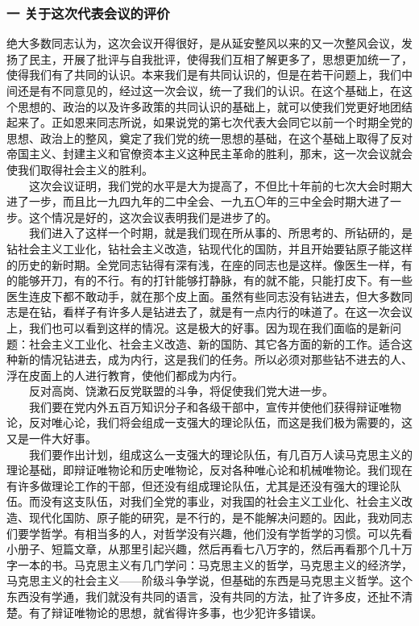 \documentclass[cn,11pt,chinese]{elegantbook}
\def\myformat#1{\hfil\hfil #1}
\begin{document}
\subsubsection*{\myformat{一 关于这次代表会议的评价}}
绝大多数同志认为，这次会议开得很好，是从延安整风以来的又一次整风会议，发扬了民主，开展了批评与自我批评，使得我们互相了解更多了，思想更加统一了，使得我们有了共同的认识。本来我们是有共同认识的，但是在若干问题上，我们中间还是有不同意见的，经过这一次会议，统一了我们的认识。在这个基础上，在这个思想的、政治的以及许多政策的共同认识的基础上，就可以使我们党更好地团结起来了。正如恩来同志所说，如果说党的第七次代表大会同它以前一个时期全党的思想、政治上的整风，奠定了我们党的统一思想的基础，在这个基础上取得了反对帝国主义、封建主义和官僚资本主义这种民主革命的胜利，那末，这一次会议就会使我们取得社会主义的胜利。\\
　　这次会议证明，我们党的水平是大为提高了，不但比十年前的七次大会时期大进了一步，而且比一九四九年的二中全会、一九五〇年的三中全会时期大进了一步。这个情况是好的，这次会议表明我们是进步了的。\\
　　我们进入了这样一个时期，就是我们现在所从事的、所思考的、所钻研的，是钻社会主义工业化，钻社会主义改造，钻现代化的国防，并且开始要钻原子能这样的历史的新时期。全党同志钻得有深有浅，在座的同志也是这样。像医生一样，有的能够开刀，有的不行。有的打针能够打静脉，有的就不能，只能打皮下。有一些医生连皮下都不敢动手，就在那个皮上面。虽然有些同志没有钻进去，但大多数同志是在钻，看样子有许多人是钻进去了，就是有一点内行的味道了。在这一次会议上，我们也可以看到这样的情况。这是极大的好事。因为现在我们面临的是新问题：社会主义工业化、社会主义改造、新的国防、其它各方面的新的工作。适合这种新的情况钻进去，成为内行，这是我们的任务。所以必须对那些钻不进去的人、浮在皮面上的人进行教育，使他们都成为内行。\\
　　反对高岗、饶漱石反党联盟的斗争，将促使我们党大进一步。\\
　　我们要在党内外五百万知识分子和各级干部中，宣传并使他们获得辩证唯物论，反对唯心论，我们将会组成一支强大的理论队伍，而这是我们极为需要的，这又是一件大好事。\\
　　我们要作出计划，组成这么一支强大的理论队伍，有几百万人读马克思主义的理论基础，即辩证唯物论和历史唯物论，反对各种唯心论和机械唯物论。我们现在有许多做理论工作的干部，但还没有组成理论队伍，尤其是还没有强大的理论队伍。而没有这支队伍，对我们全党的事业，对我国的社会主义工业化、社会主义改造、现代化国防、原子能的研究，是不行的，是不能解决问题的。因此，我劝同志们要学哲学。有相当多的人，对哲学没有兴趣，他们没有学哲学的习惯。可以先看小册子、短篇文章，从那里引起兴趣，然后再看七八万字的，然后再看那个几十万字一本的书。马克思主义有几门学问：马克思主义的哲学，马克思主义的经济学，马克思主义的社会主义——阶级斗争学说，但基础的东西是马克思主义哲学。这个东西没有学通，我们就没有共同的语言，没有共同的方法，扯了许多皮，还扯不清楚。有了辩证唯物论的思想，就省得许多事，也少犯许多错误。\\
\end{document}
